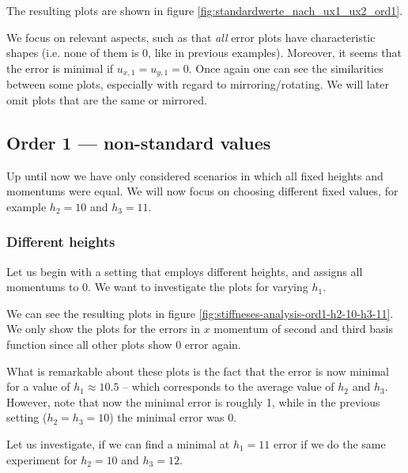 \documentclass{article}
\begin{document}
The resulting plots are shown in figure \ref{fig:standardwerte_nach_ux1_ux2_ord1}.



We focus on relevant aspects, such as that \emph{all} error plots have characteristic shapes (i.e. none of them is 0, like in previous examples). Moreover, it seems that the error is minimal if $u_{x,1}=u_{y,1}=0$. Once again one can see the similarities between some plots, especially with regard to mirroring/rotating. We will later omit plots that are the same or mirrored.

\clearpage{} %

\subsection{Order 1 --- non-standard values}
\label{sec:stiffness-analysis-ord1-non-std-values}

Up until now we have only considered scenarios in which all fixed heights and momentums were equal. We will now focus on choosing different fixed values, for example $h_2=10$ and $h_3=11$.

\subsubsection{Different heights}
\label{sec:stiffness-analysis-ord1-differing-h2-10-h3-11}

Let us begin with a setting that employs different heights, and assigns all momentums to 0. We want to investigate the plots for varying $h_1$.



We can see the resulting plots in figure \ref{fig:stiffneses-analysis-ord1-h2-10-h3-11}. We only show the plots for the errors in $x$ momentum of second and third basis function since all other plots show 0 error again.

What is remarkable about these plots is the fact that the error is now minimal for a value of $h_1\approx 10.5$ -- which corresponds to the average value of $h_2$ and $h_3$. However, note that now the minimal error is roughly 1, while in the previous setting ($h_2=h_3=10$) the minimal error was 0.

Let us investigate, if we can find a minimal at $h_1=11$ error if we do the same experiment for $h_2=10$ and $h_3=12$.
\end{document}
